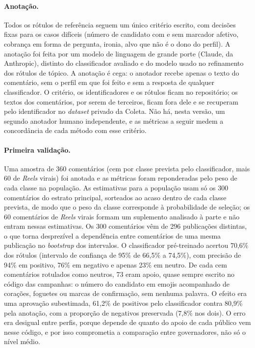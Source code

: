 \paragraph*{Anotação.} Todos os rótulos de referência seguem um único critério escrito, com decisões fixas para os casos difíceis (número de candidato com e sem marcador afetivo, cobrança em forma de pergunta, ironia, alvo que não é o dono do perfil). A anotação foi feita por um modelo de linguagem de grande porte (Claude, da Anthropic), distinto do classificador avaliado e do modelo usado no refinamento dos rótulos de tópico. A anotação é cega: o anotador recebe apenas o texto do comentário, sem o perfil em que foi feito e sem a resposta de qualquer classificador. O critério, os identificadores e os rótulos ficam no repositório; os textos dos comentários, por serem de terceiros, ficam fora dele e se recuperam pelo identificador no \emph{dataset} privado da Coleta. Não há, nesta versão, um segundo anotador humano independente, e as métricas a seguir medem a concordância de cada método com esse critério.

\paragraph*{Primeira validação.} Uma amostra de 360 comentários (cem por classe prevista pelo classificador, mais 60 de \emph{Reels} virais) foi anotada e as métricas foram reponderadas pelo peso de cada classe na população. As estimativas para a população usam só os 300 comentários do estrato principal, sorteados ao acaso dentro de cada classe prevista, de modo que o peso da classe corresponde à probabilidade de seleção; os 60 comentários de \emph{Reels} virais formam um suplemento analisado à parte e não entram nessas estimativas. Os 300 comentários vêm de 296 publicações distintas, o que torna desprezível a dependência entre comentários de uma mesma publicação no \emph{bootstrap} dos intervalos. O classificador pré-treinado acertou 70,6\% dos rótulos (intervalo de confiança de 95\% de 66,5\% a 74,5\%), com precisão de 94\% em positivo, 76\% em negativo e apenas 23\% em neutro. De cada cem comentários rotulados como neutros, 73 eram apoio, quase sempre escrito no código das campanhas: o número do candidato em emojis acompanhado de corações, foguetes ou marcas de confirmação, sem nenhuma palavra. O efeito era uma aprovação subestimada, 61,2\% de positivos pelo classificador contra 80,9\% pela anotação, com a proporção de negativos preservada (7,8\% nos dois). O erro era desigual entre perfis, porque depende de quanto do apoio de cada público vem nesse código, e por isso comprometia a comparação entre governadores, não só o nível médio.

